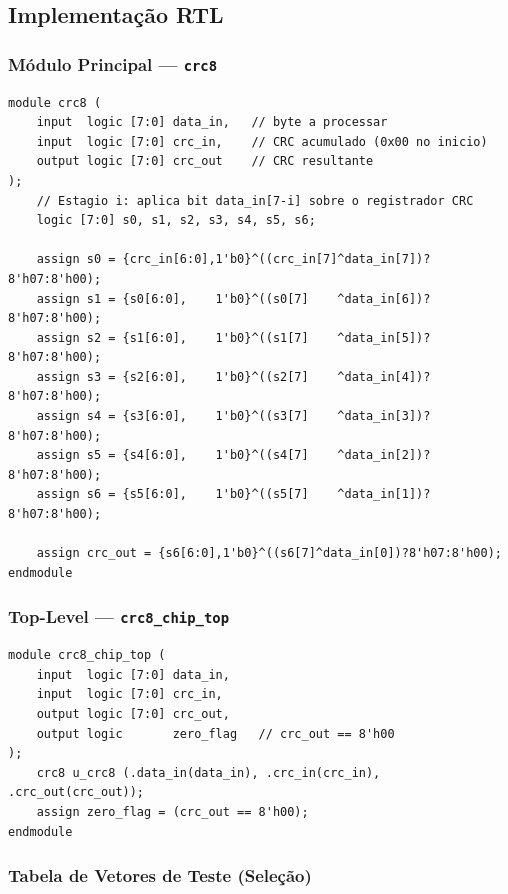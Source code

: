 \documentclass[12pt,a4paper]{article}
\begin{document}
\subsection{Implementação RTL}

\subsubsection{Módulo Principal --- \texttt{crc8}}

\begin{lstlisting}[style=svstyle, caption={crc8.sv -- Núcleo CRC-8/SMBUS combinacional},
                   label={lst:crc8}]
module crc8 (
    input  logic [7:0] data_in,   // byte a processar
    input  logic [7:0] crc_in,    // CRC acumulado (0x00 no inicio)
    output logic [7:0] crc_out    // CRC resultante
);
    // Estagio i: aplica bit data_in[7-i] sobre o registrador CRC
    logic [7:0] s0, s1, s2, s3, s4, s5, s6;

    assign s0 = {crc_in[6:0],1'b0}^((crc_in[7]^data_in[7])?8'h07:8'h00);
    assign s1 = {s0[6:0],    1'b0}^((s0[7]    ^data_in[6])?8'h07:8'h00);
    assign s2 = {s1[6:0],    1'b0}^((s1[7]    ^data_in[5])?8'h07:8'h00);
    assign s3 = {s2[6:0],    1'b0}^((s2[7]    ^data_in[4])?8'h07:8'h00);
    assign s4 = {s3[6:0],    1'b0}^((s3[7]    ^data_in[3])?8'h07:8'h00);
    assign s5 = {s4[6:0],    1'b0}^((s4[7]    ^data_in[2])?8'h07:8'h00);
    assign s6 = {s5[6:0],    1'b0}^((s5[7]    ^data_in[1])?8'h07:8'h00);

    assign crc_out = {s6[6:0],1'b0}^((s6[7]^data_in[0])?8'h07:8'h00);
endmodule
\end{lstlisting}

\subsubsection{Top-Level --- \texttt{crc8\_chip\_top}}

\begin{lstlisting}[style=svstyle, caption={crc8\_chip\_top.sv -- Módulo de topo com zero\_flag},
                   label={lst:top}]
module crc8_chip_top (
    input  logic [7:0] data_in,
    input  logic [7:0] crc_in,
    output logic [7:0] crc_out,
    output logic       zero_flag   // crc_out == 8'h00
);
    crc8 u_crc8 (.data_in(data_in), .crc_in(crc_in), .crc_out(crc_out));
    assign zero_flag = (crc_out == 8'h00);
endmodule
\end{lstlisting}

\subsubsection{Tabela de Vetores de Teste (Seleção)}
\end{document}
